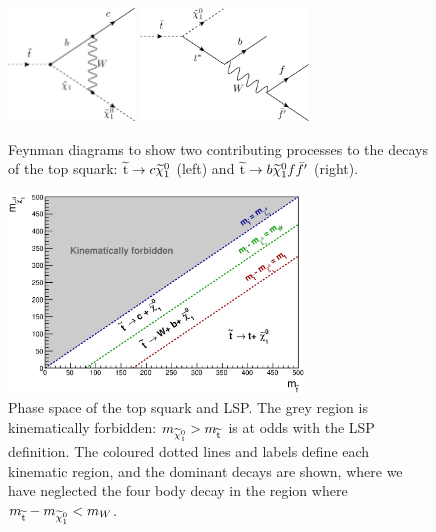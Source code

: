 \begin{figure}[t!]
  \begin{center}
  \includegraphics[width=0.3\textwidth]{Figures/theory/stop2bodydecay.pdf}
  \includegraphics[width=0.4\textwidth]{Figures/theory/stop4bodydecay.pdf}
  \caption{Feynman diagrams to show two contributing processes to the decays of the top squark: $\widetilde{{\rm t}} \rightarrow c \widetilde{\chi}^{0}_{1}$ (left) and $\widetilde{{\rm t}} \rightarrow b \widetilde{\chi}^{0}_{1} f \bar{f}'$ (right). }
  \label{fig:stopDecays}
  \end{center}
\end{figure}
 

\begin{figure}[t!]
  \begin{center}
  \includegraphics[width=0.7\textwidth]{Figures/theory/stopMassPlane}
  \caption{Phase space of the top squark and LSP. The grey region is kinematically forbidden: 
  $m_{\widetilde{\chi}^{0}_{1}} > m_{\widetilde{{\rm t}}}$ is at odds with the \ac{LSP} definition. 
  The coloured dotted lines and labels define each kinematic region, and the dominant \sTop{} decays are shown, where we have neglected the four body decay in the region where $m_{\widetilde{{\rm t}}} - m_{\widetilde{\chi}^{0}_{1}} < m_{W}$.}
  \label{fig:stopDecayMassPlane}
  \end{center}
\end{figure}

